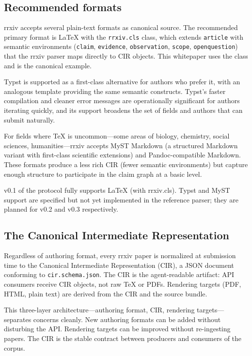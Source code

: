 \documentclass[11pt]{rrxiv}
\begin{document}
\subsection{Recommended formats}

rrxiv accepts several plain-text formats as canonical source. The recommended primary format is LaTeX with the \texttt{rrxiv.cls} class, which extends \texttt{article} with semantic environments (\texttt{claim}, \texttt{evidence}, \texttt{observation}, \texttt{scope}, \texttt{openquestion}) that the rrxiv parser maps directly to CIR objects. This whitepaper uses the class and is the canonical example.

Typst is supported as a first-class alternative for authors who prefer it, with an analogous template providing the same semantic constructs. Typst's faster compilation and cleaner error messages are operationally significant for authors iterating quickly, and its support broadens the set of fields and authors that can submit naturally.

For fields where TeX is uncommon---some areas of biology, chemistry, social sciences, humanities---rrxiv accepts MyST Markdown (a structured Markdown variant with first-class scientific extensions) and Pandoc-compatible Markdown. These formats produce a less rich CIR (fewer semantic environments) but capture enough structure to participate in the claim graph at a basic level.

\begin{scope}
v0.1 of the protocol fully supports LaTeX (with rrxiv.cls). Typst and MyST support are specified but not yet implemented in the reference parser; they are planned for v0.2 and v0.3 respectively.
\end{scope}

\subsection{The Canonical Intermediate Representation}

Regardless of authoring format, every rrxiv paper is normalized at submission time to the Canonical Intermediate Representation (CIR), a JSON document conforming to \texttt{cir.schema.json}. The CIR is the agent-readable artifact: API consumers receive CIR objects, not raw TeX or PDFs. Rendering targets (PDF, HTML, plain text) are derived from the CIR and the source bundle.

This three-layer architecture---authoring format, CIR, rendering targets---separates concerns cleanly. New authoring formats can be added without disturbing the API. Rendering targets can be improved without re-ingesting papers. The CIR is the stable contract between producers and consumers of the corpus.
\end{document}

